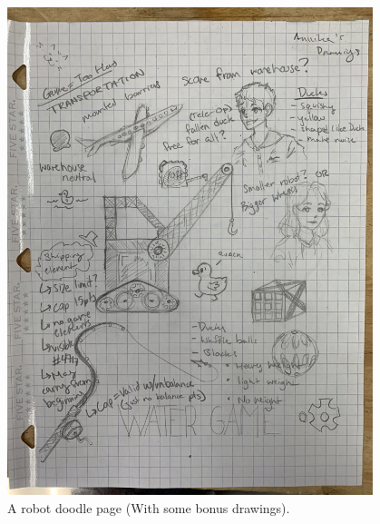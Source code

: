 \begin{figure}[ht]
\centering
\begin{minipage}[b]{.48\textwidth}
  \centering
  \includegraphics[width=0.95\textwidth]{Meetings/September/09-21-21/9-19-21_Team_Image3 - Nathan Forrer.JPG}
  \caption{A robot doodle page (With some bonus drawings).}
  \label{fig:pic3}
\end{minipage}%
\hfill%
\begin{minipage}[b]{.48\textwidth}
  \centering

\end{minipage}
\end{figure}
